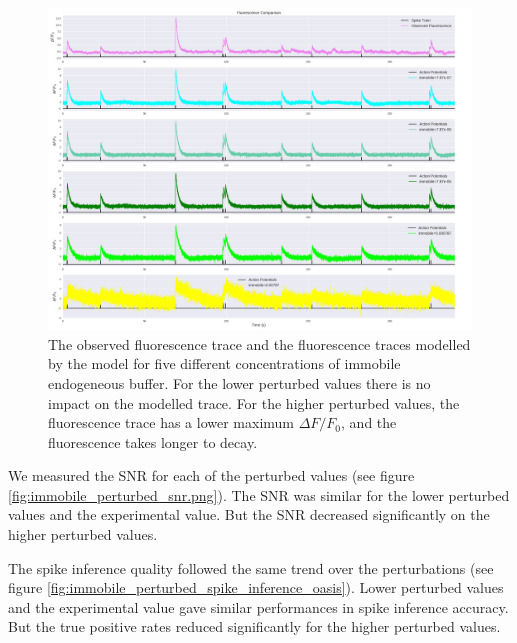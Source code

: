 \documentclass[a4paper,12pt]{article}
\theoremstyle{definition}
\begin{document}
\begin{figure}[ht]
  \centering
  \includegraphics[width=\textwidth]{figures/immobile_peturbed_fluorescence_18.png}
  \caption{The observed fluorescence trace and the fluorescence traces modelled by the model for five different concentrations of immobile endogeneous buffer. For the lower perturbed values there is no impact on the modelled trace. For the higher perturbed values, the fluorescence trace has a lower maximum $\Delta F/ F_0$, and the fluorescence takes longer to decay.}
  \label{fig:immobile_peturbed_fluorescence}
\end{figure}

We measured the SNR for each of the perturbed values (see figure \ref{fig:immobile_perturbed_snr.png}). The SNR was similar for the lower perturbed values and the experimental value. But the SNR decreased significantly on the higher perturbed values.

The spike inference quality followed the same trend over the perturbations (see figure \ref{fig:immobile_perturbed_spike_inference_oasis}). Lower perturbed values and the experimental value gave similar performances in spike inference accuracy. But the true positive rates reduced significantly for the higher perturbed values.
\end{document}
